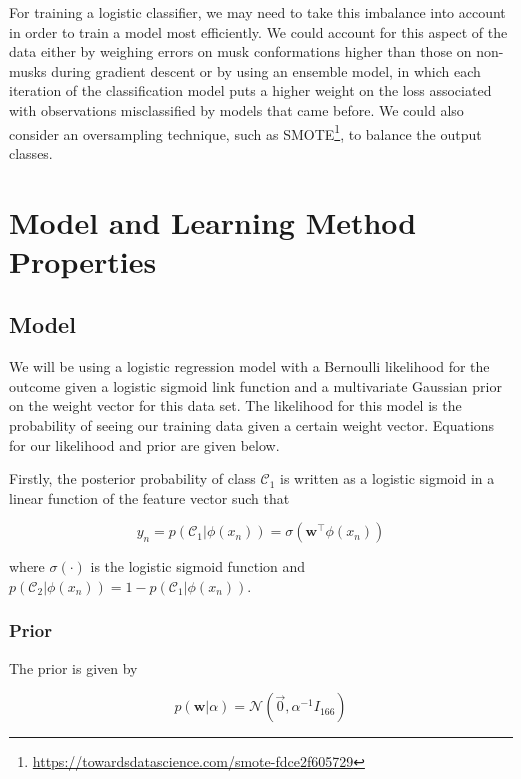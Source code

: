 \documentclass[12pt]{article}
\begin{document}
For training a logistic classifier, we may need to take this imbalance into account in order to train a model most efficiently. We could account for this aspect of the data either by weighing errors on musk conformations higher than those on non-musks during gradient descent or by using an ensemble model, in which each iteration of the classification model puts a higher weight on the loss associated with observations misclassified by models that came before. We could also consider an oversampling technique, such as SMOTE\footnote{\url{https://towardsdatascience.com/smote-fdce2f605729}}, to balance the output classes.

\newpage

\section{Model and Learning Method Properties}
  
\subsection{Model}

We will be using a logistic regression model with a Bernoulli likelihood for the outcome given a logistic sigmoid link function and a multivariate Gaussian prior on the weight vector for this data set. The likelihood for this model is the probability of seeing our training data given a certain weight vector. Equations for our likelihood and prior are given below.

Firstly, the posterior probability of class $\mathcal{C}_1$ is written as a logistic sigmoid in a linear function of the feature vector such that

\begin{equation}
	y_n = p(\mathcal{C}_1|\phi(x_n)) = \sigma(\textbf{w}^\top \phi(x_n))
\end{equation}

where $\sigma(\cdot)$ is the logistic sigmoid function and $p(\mathcal{C}_2|\phi(x_n)) = 1 - p(\mathcal{C}_1|\phi(x_n))$.

\subsubsection{Prior}

The prior is given by

\begin{equation}
    p(\textbf{w}|\alpha) = \mathcal{N}(\vec{0}, \alpha^{-1}I_{166})
\end{equation}
\end{document}
